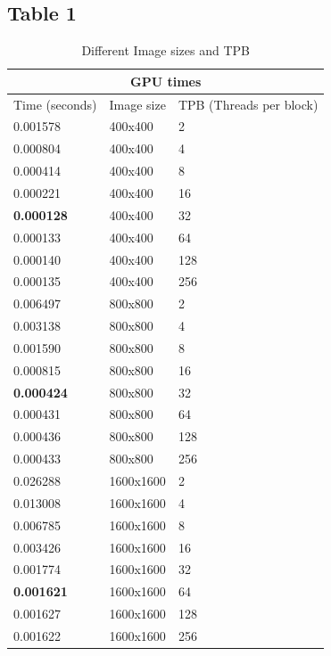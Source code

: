 \documentclass[english]{exam}
\begin{document}
\subsection*{Table 1}
\begin{table}[H]
  \centering
  \begin{tabular}{ |p{4cm}||p{4cm}|p{4cm}|  }
    \hline
    \multicolumn{3}{|c|}{GPU times} \\
    \hline
    Time (seconds)& Image size& TPB (Threads per block)\\
    \hline
    0.001578& 400x400& 2\\
    0.000804& 400x400& 4\\
    0.000414& 400x400& 8\\
    0.000221& 400x400& 16\\
    \textbf{0.000128}& 400x400& 32\\
    0.000133& 400x400& 64\\
    0.000140& 400x400& 128\\
    0.000135& 400x400& 256\\
    0.006497& 800x800& 2\\
    0.003138& 800x800& 4\\
    0.001590& 800x800& 8\\
    0.000815& 800x800& 16\\
    \textbf{0.000424}& 800x800& 32\\
    0.000431& 800x800& 64\\
    0.000436& 800x800& 128\\
    0.000433& 800x800& 256\\
    0.026288& 1600x1600& 2\\
    0.013008& 1600x1600& 4\\
    0.006785& 1600x1600& 8\\
    0.003426& 1600x1600& 16\\
    0.001774& 1600x1600& 32\\
    \textbf{0.001621}& 1600x1600& 64\\
    0.001627& 1600x1600& 128\\
    0.001622& 1600x1600& 256\\
    \hline
  \end{tabular}
  \caption{Different Image sizes and TPB}
  \label{tab:1}
\end{table}
\end{document}
